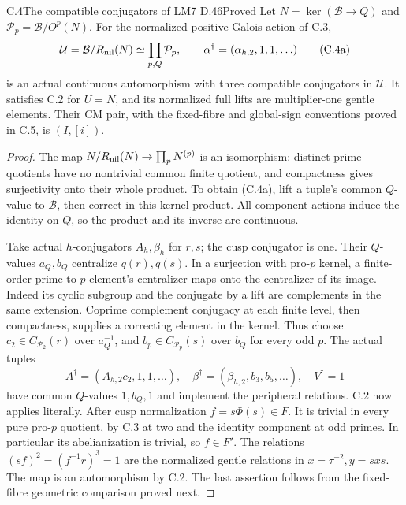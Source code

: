 \begin{statement}{C.4}{The compatible conjugators of LM7 D.46}{Proved}
Let \(N=\ker(\mathcal B\to Q)\) and
\(\mathcal P_p=\mathcal B/O^p(N)\).
For the normalized positive Galois action of C.3,
\[
 \mathcal U=\mathcal B/R_{\rm nil}(N)
       \simeq\mathop{\prod}_{p,Q}\mathcal P_p,\qquad
 \alpha^\dagger=(\alpha_{h,2},1,1,\ldots)
 \tag{C.4a}
\]
is an actual continuous automorphism with three compatible
conjugators in \(\mathcal U\).
It satisfies C.2 for \(U=N\), and its normalized full lifts
are multiplier-one gentle elements.
Their CM pair, with the fixed-fibre and global-sign
conventions proved in C.5, is \((I,[i])\).
\end{statement}
\begin{proof}
The map \(N/R_{\rm nil}(N)\to\prod_pN^{(p)}\) is an
isomorphism: distinct prime quotients have no nontrivial
common finite quotient, and compactness gives surjectivity
onto their whole product. To obtain (C.4a), lift a tuple's
common \(Q\)-value to \(\mathcal B\), then correct in this
kernel product. All component actions induce the identity
on \(Q\), so the product and its inverse are continuous.

Take actual \(h\)-conjugators \(A_h,\beta_h\) for \(r,s\);
the cusp conjugator is one. Their \(Q\)-values \(a_Q,b_Q\)
centralize \(q(r),q(s)\).
In a surjection with pro-\(p\) kernel, a finite-order
prime-to-\(p\) element's centralizer maps onto the centralizer
of its image. Indeed its cyclic subgroup and the conjugate
by a lift are complements in the same extension.
Coprime complement conjugacy at each finite level, then
compactness, supplies a correcting element in the kernel.
Thus choose \(c_2\in C_{\mathcal P_2}(r)\) over \(a_Q^{-1}\),
and \(b_p\in C_{\mathcal P_p}(s)\) over \(b_Q\) for every odd \(p\).
The actual tuples
\[
 A^\dagger=(A_{h,2}c_2,1,1,\ldots),\quad
 \beta^\dagger=(\beta_{h,2},b_3,b_5,\ldots),\quad V^\dagger=1
 \tag{C.4b}
\]
have common \(Q\)-values \(1,b_Q,1\) and implement the
peripheral relations. C.2 now applies literally.
After cusp normalization \(f=s\Phi(s)\in F\).
It is trivial in every pure pro-\(p\) quotient, by C.3 at
two and the identity component at odd primes.
In particular its abelianization is trivial, so \(f\in F'\).
The relations \((sf)^2=(f^{-1}r)^3=1\) are the normalized
gentle relations in \(x=\tau^{-2},y=sxs\).
The map is an automorphism by C.2.
The last assertion follows from the fixed-fibre geometric
comparison proved next.
\end{proof}

